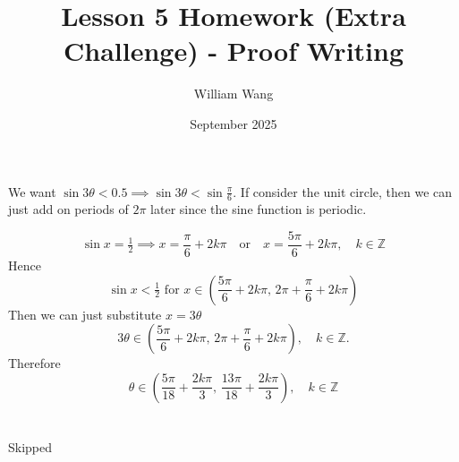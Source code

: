 \documentclass{article}
\title{Lesson 5 Homework (Extra Challenge) - Proof Writing}
\author{William Wang}
\date{September 2025}
\begin{document}
\maketitle

\section{}
We want $\sin 3\theta < 0.5 \implies \sin 3\theta < \sin \frac{\pi}{6}$. If consider the unit circle, then we can just add on periods of $2\pi$ later since the sine function is periodic. 

\[\sin x = \tfrac{1}{2} \implies x = \frac{\pi}{6} + 2k\pi \quad \text{or} \quad x = \frac{5\pi}{6} + 2k\pi, \quad k \in \mathbb{Z}\]
Hence
\[\sin x < \tfrac{1}{2} \text{ for } x \in \left( \frac{5\pi}{6} + 2k\pi, \, 2\pi + \frac{\pi}{6} + 2k\pi \right)\]
Then we can just substitute $x = 3\theta$
\[3\theta \in \left( \frac{5\pi}{6} + 2k\pi, \, 2\pi + \frac{\pi}{6} + 2k\pi \right), \quad k \in \mathbb{Z}.\]
Therefore 
\[ \theta \in \left( \frac{5\pi}{18} + \frac{2k\pi}{3}, \, \frac{13\pi}{18} + \frac{2k\pi}{3} \right), \quad k \in \mathbb{Z}\]
\section{}
Skipped
\end{document}
